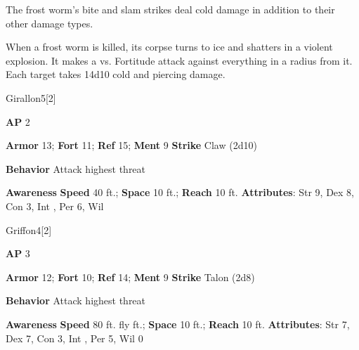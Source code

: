 The frost worm's bite and slam strikes deal cold damage in addition to their other damage types.

\vspace{0.5em}
When a frost worm is killed, its corpse turns to ice and shatters in a violent explosion.
It makes a  vs. Fortitude attack against everything in a \areahuge radius from it.
\hit Each target takes 14d10 cold and piercing damage.

\begin{monsection}{Girallon}{5}[2]
\vspace{-1em}\vspace{-1em}
\begin{spellcontent}
\begin{spelltargetinginfo}
{\textbf{AP} 2}

\pari \textbf{Armor} 13;
\textbf{Fort} 11;
\textbf{Ref} 15;
\textbf{Ment} 9
\pari \textbf{Strike} Claw  (2d10)



\pari \textbf{Behavior} Attack highest threat
\end{spelltargetinginfo}
\end{spellcontent}

\begin{monsterfooter}
\pari \textbf{Awareness} 
\pari \textbf{Speed} 40 ft.;
\textbf{Space} 10 ft.;
\textbf{Reach} 10 ft.
\pari \textbf{Attributes}:
Str 9,
Dex 8,
Con 3,
Int ,
Per 6,
Wil 
\end{monsterfooter}
\end{monsection}

\begin{monsection}{Griffon}{4}[2]
\vspace{-1em}\vspace{-1em}
\begin{spellcontent}
\begin{spelltargetinginfo}
{\textbf{AP} 3}

\pari \textbf{Armor} 12;
\textbf{Fort} 10;
\textbf{Ref} 14;
\textbf{Ment} 9
\pari \textbf{Strike} Talon  (2d8)



\pari \textbf{Behavior} Attack highest threat
\end{spelltargetinginfo}
\end{spellcontent}

\begin{monsterfooter}
\pari \textbf{Awareness} 
\pari \textbf{Speed} 80 ft. fly ft.;
\textbf{Space} 10 ft.;
\textbf{Reach} 10 ft.
\pari \textbf{Attributes}:
Str 7,
Dex 7,
Con 3,
Int ,
Per 5,
Wil 0
\end{monsterfooter}
\end{monsection}


